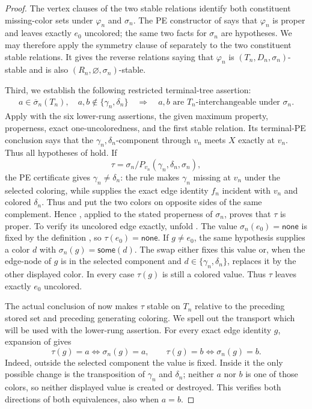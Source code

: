 \begin{proof}
The vertex clauses of the two stable relations identify both constituent
missing-color sets under $\varphi_n$ and $\sigma_n$.  The PE constructor
of  says that $\varphi_n$ is proper and
leaves exactly $e_0$ uncolored; the same two facts for $\sigma_n$ are
hypotheses.  We may therefore apply the symmetry clause of 
separately to the two constituent stable relations.  It gives the reverse
relations saying that $\varphi_n$ is $(T_n,D_n,\sigma_n)$-stable and is
also $(R_n,\varnothing,\sigma_n)$-stable.

Third, we establish the following restricted terminal-tree assertion:
\[
 \begin{split}
 a\in\overline\sigma_n(T_n),\quad
 a,b\notin\{\gamma_n,\delta_n\}
 \quad\Longrightarrow\quad
 a,b\text{ are }T_n\text{-interchangeable under }\sigma_n.
                                                               \tag{6}
 \end{split}
\]
Apply  with the six lower-rung assertions, the
given maximum property, properness, exact one-uncoloredness, and the
first stable relation.  Its terminal-PE conclusion says that the
$\gamma_n,\delta_n$-component through $v_n$ meets $X$ exactly at
$v_n$.  Thus all hypotheses of
 hold.  If
\[
 \tau=\sigma_n/P_{v_n}(\gamma_n,\delta_n,\sigma_n),
\]
the PE certificate gives $\gamma_n\ne\delta_n$: the rule
 makes $\gamma_n$ missing at $v_n$ under
the selected coloring, while  supplies the
exact edge identity $f_n$ incident with $v_n$ and colored $\delta_n$.
Thus  and  put the two colors
on opposite sides of the same complement.  Hence
,
applied to the stated properness of $\sigma_n$, proves that $\tau$ is
proper.  To verify its uncolored edge exactly, unfold
.  The value $\sigma_n(e_0)=\mathsf{none}$
is fixed by the definition , so
$\tau(e_0)=\mathsf{none}$.  If $g\ne e_0$, the same hypothesis supplies
a color $d$ with $\sigma_n(g)=\mathsf{some}(d)$.  The swap either fixes
this value or, when the edge-node of $g$ is in the selected component and
$d\in\{\gamma_n,\delta_n\}$, replaces it by the other displayed color.
In every case $\tau(g)$ is still a colored value.  Thus $\tau$ leaves
exactly $e_0$ uncolored.

The actual conclusion of  now makes
$\tau$ stable on $T_n$ relative to the preceding stored set and preceding
generating coloring.  We spell out the transport which will be used with
the lower-rung assertion.  For every exact edge identity $g$, expansion of
 gives
\[
 \tau(g)=a\iff\sigma_n(g)=a,
 \qquad
 \tau(g)=b\iff\sigma_n(g)=b.                                \tag{4}
\]
Indeed, outside the selected component the value is fixed.  Inside it the
only possible change is the transposition of $\gamma_n$ and $\delta_n$;
neither $a$ nor $b$ is one of those colors, so neither displayed value is
created or destroyed.  This verifies both directions of both equivalences,
also when $a=b$.


\end{proof}
